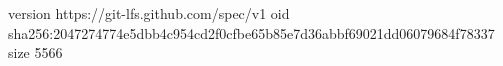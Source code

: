version https://git-lfs.github.com/spec/v1
oid sha256:2047274774e5dbb4c954cd2f0cfbe65b85e7d36abbf69021dd06079684f78337
size 5566
